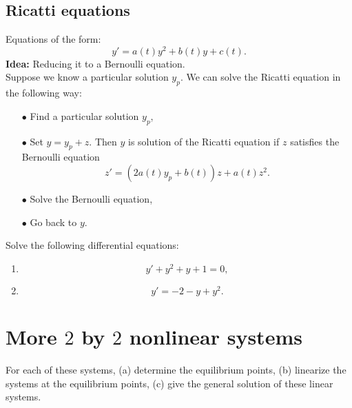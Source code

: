 \subsection{Ricatti equations}
Equations of the form: \[y' = a(t)y^2 +b(t) y + c(t). \]
\textbf{Idea:} Reducing it to a Bernoulli equation.\\

Suppose we know a particular solution $y_p$. We can solve the Ricatti equation in the following way:
\begin{itemize}
\item[$\bullet$] Find a particular solution $y_p$,
\item[$\bullet$] Set $y= y_p + z $. Then $y$ is solution of the Ricatti equation if $z$ satisfies the Bernoulli equation
\[z'= (2a(t)y_p +b(t)) z + a(t) z^2 .\]
\item[$\bullet$] Solve the Bernoulli equation,
\item[$\bullet$] Go back to $y$.
\end{itemize}

Solve the following differential equations:
\begin{enumerate}
\item \[y' +y^2+y+1 =0,\]
\item \[y' =-2-y +y^2.\]
\end{enumerate}

\section{More $2$ by $2$ nonlinear systems}

For each of these systems, (a) determine the equilibrium points, (b) linearize the systems at the equilibrium points, (c) give the general solution of these linear systems.

